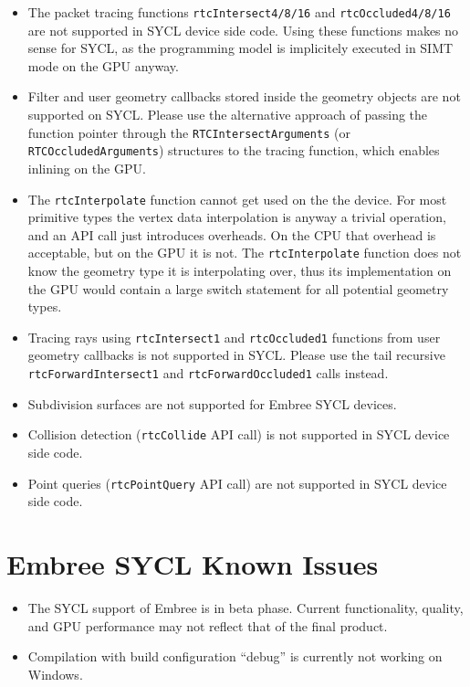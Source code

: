 \begin{itemize}
\item
  The packet tracing functions \texttt{rtcIntersect4/8/16} and
  \texttt{rtcOccluded4/8/16} are not supported in SYCL device side code.
  Using these functions makes no sense for SYCL, as the programming
  model is implicitely executed in SIMT mode on the GPU anyway.
\item
  Filter and user geometry callbacks stored inside the geometry objects
  are not supported on SYCL. Please use the alternative approach of
  passing the function pointer through the
  \texttt{RTCIntersectArguments} (or \texttt{RTCOccludedArguments})
  structures to the tracing function, which enables inlining on the GPU.
\item
  The \texttt{rtcInterpolate} function cannot get used on the the
  device. For most primitive types the vertex data interpolation is
  anyway a trivial operation, and an API call just introduces overheads.
  On the CPU that overhead is acceptable, but on the GPU it is not. The
  \texttt{rtcInterpolate} function does not know the geometry type it is
  interpolating over, thus its implementation on the GPU would contain a
  large switch statement for all potential geometry types.
\item
  Tracing rays using \texttt{rtcIntersect1} and \texttt{rtcOccluded1}
  functions from user geometry callbacks is not supported in SYCL.
  Please use the tail recursive \texttt{rtcForwardIntersect1} and
  \texttt{rtcForwardOccluded1} calls instead.
\item
  Subdivision surfaces are not supported for Embree SYCL devices.
\item
  Collision detection (\texttt{rtcCollide} API call) is not supported in
  SYCL device side code.
\item
  Point queries (\texttt{rtcPointQuery} API call) are not supported in
  SYCL device side code.
\end{itemize}

\section{Embree SYCL Known Issues}\label{embree-sycl-known-issues}

\begin{itemize}
\item
  The SYCL support of Embree is in beta phase. Current functionality,
  quality, and GPU performance may not reflect that of the final
  product.
\item
  Compilation with build configuration ``debug'' is currently not
  working on Windows.
\end{itemize}

